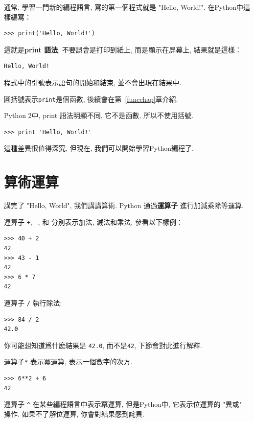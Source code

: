 \documentclass[10pt]{book}
\begin{document}
通常, 學習一門新的編程語言, 寫的第一個程式就是 "Hello, World!". 
在Python中這樣編寫：

\begin{verbatim}
>>> print('Hello, World!')
\end{verbatim}
%

這就是{\bf print 語法}, 不要誤會是打印到紙上, 而是顯示在屏幕上, 
結果就是這樣：

\begin{verbatim}
Hello, World!
\end{verbatim}
%

程式中的引號表示語句的開始和結束, 並不會出現在結果中. 

圓括號表示{\tt print}是個函數, 後續會在第~\ref{funcchap}章介紹. 
 

Python 2中, print 語法明顯不同, 它不是函數, 所以不使用括號. 

\begin{verbatim}
>>> print 'Hello, World!'
\end{verbatim}
%
這種差異很值得深究, 
但現在, 我們可以開始學習Python編程了. 


\section{算術運算}

講完了 "Hello, World", 我們講講算術. Python 通過{\bf 運算子} 
進行加減乘除等運算. 

運算子 {\tt +}, {\tt -}, 和 {\tt *} 分別表示加法, 減法和乘法, 參看以下樣例：

\begin{verbatim}
>>> 40 + 2
42
>>> 43 - 1
42
>>> 6 * 7
42
\end{verbatim}
%
運算子 {\tt /} 執行除法:

\begin{verbatim}
>>> 84 / 2
42.0
\end{verbatim}
%

你可能想知道爲什麽結果是 {\tt 42.0}, 而不是{\tt 42}, 下節會對此進行解釋. 

運算子{\tt **} 表示冪運算, 表示一個數字的次方. 

\begin{verbatim}
>>> 6**2 + 6
42
\end{verbatim}
%

運算子 \verb"^" 在某些編程語言中表示冪運算, 但是Python中, 
它表示位運算的 "異或" 操作. 如果不了解位運算, 你會對結果感到詫異. 
\end{document}
